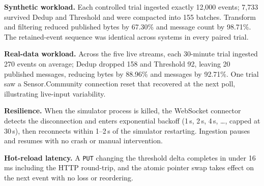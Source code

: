 \documentclass[conference]{IEEEtran}
\begin{document}
\textbf{Synthetic workload.} Each controlled trial ingested exactly 12,000 events; 7,733 survived Dedup and Threshold and were compacted into 155 batches. Transform and filtering reduced published bytes by 67.30\% and message count by 98.71\%. The retained-event sequence was identical across systems in every paired trial.

\textbf{Real-data workload.} Across the five live streams, each 30-minute trial ingested 270 events on average; Dedup dropped 158 and Threshold 92, leaving 20 published messages, reducing bytes by 88.96\% and messages by 92.71\%. One trial saw a Sensor.Community connection reset that recovered at the next poll, illustrating live-input variability.

\textbf{Resilience.} When the simulator process is killed, the WebSocket connector detects the disconnection and enters exponential backoff (1\,s, 2\,s, 4\,s, \ldots, capped at 30\,s), then reconnects within 1--2\,s of the simulator restarting. Ingestion pauses and resumes with no crash or manual intervention.

\textbf{Hot-reload latency.} A \texttt{PUT} changing the threshold delta completes in under 16\,ms including the HTTP round-trip, and the atomic pointer swap takes effect on the next event with no loss or reordering.

\begin{table}[t]
  \centering
  \caption{Controlled comparison on both platforms (mean $\pm$ sample SD; three trials each).}
  \label{tab:controlled}
\end{table}
\end{document}
